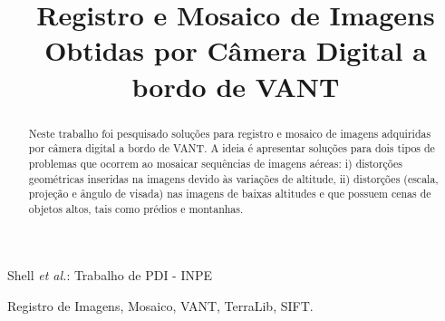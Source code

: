 \documentclass[9pt, a4paper, nofonttune, journal]{IEEEtran}
\begin{document}
\title{Registro e Mosaico de Imagens \\Obtidas por Câmera Digital a bordo de VANT}

\author{
}

%
{Shell \MakeLowercase{\textit{et al.}}: Trabalho de PDI - INPE}

\maketitle               
\renewcommand\abstractname{Resumo}
\renewcommand{\refname}{Referências}
\renewcommand\IEEEkeywordsname{Palavras-chave}


\begin{abstract}
Neste trabalho foi pesquisado soluções para registro e mosaico de imagens adquiridas por câmera digital a bordo de VANT. A ideia é apresentar soluções para dois tipos de problemas que ocorrem ao mosaicar sequências de imagens aéreas: i) distorções geométricas inseridas na imagens devido às variações de altitude, ii) distorções (escala, projeção e ângulo de visada) nas imagens de baixas altitudes e que possuem cenas de objetos altos, tais como prédios e montanhas.
\end{abstract}

\begin{IEEEkeywords}
Registro de Imagens, Mosaico, VANT, TerraLib, SIFT.
\end{IEEEkeywords}
\end{document}
